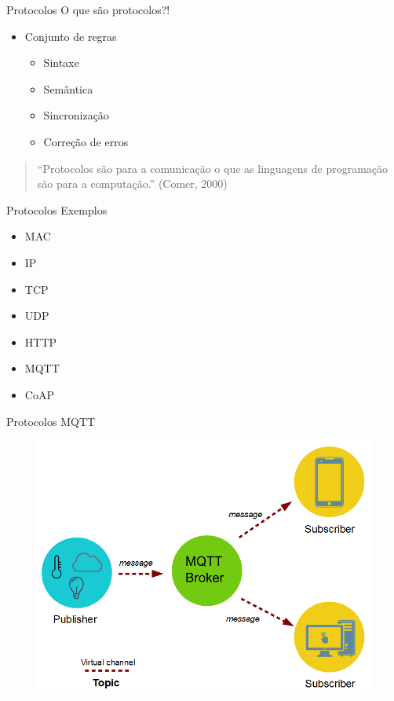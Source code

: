 \documentclass[t]{beamer}
\begin{document}
\begin{frame}{Protocolos}
O que são protocolos?!
\begin{itemize}
	\item Conjunto de regras
	\begin{itemize}
		\item Sintaxe
		\item Semântica
		\item Sincronização
		\item Correção de erros
	\end{itemize}
\end{itemize}
\bigskip
\begin{quotation}
	``Protocolos são para a comunicação o que as linguagens de programação são para a computação.'' (Comer, 2000)
\end{quotation}
\end{frame}

\begin{frame}{Protocolos}
Exemplos
\begin{itemize}
	\item MAC
	\item IP
	\item TCP
	\item UDP
	\item HTTP
	\item MQTT
	\item CoAP
\end{itemize}
\end{frame}

\begin{frame}{Protocolos}
MQTT
\begin{figure}
	\includegraphics[width=0.8\linewidth]{mqtt_publisher_subscriber}
\end{figure}
\end{frame}
\end{document}
